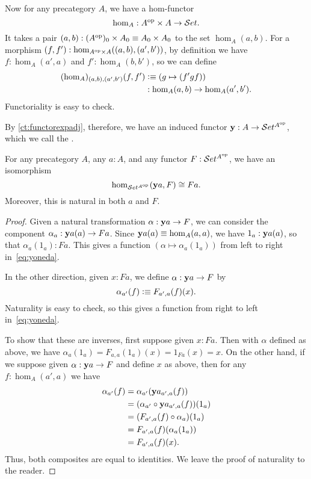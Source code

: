 Now for any precategory $A$, we have a hom-functor
\[\hom_A : A^{\textrm{op}} \times A \to \mathcal{S}et.\]
It takes a pair $(a,b): (A^{\textrm{op}})_0 \times A_0 \equiv A_0 \times A_0$ to the set $\hom_A(a,b)$.
For a morphism $(f,f') : \hom_{A^{\textrm{op}}\times A}((a,b),(a',b'))$, by definition we have $f:\hom_A(a',a)$ and $f':\hom_A(b,b')$, so we can define 
\begin{align*}
  (\hom_A)_{(a,b),(a',b')}(f,f')
  &\vcentcolon\equiv (g \mapsto (f'gf))\\
  &: \hom_A(a,b) \to \hom_A(a',b').
\end{align*}
Functoriality is easy to check.

By \autoref{ct:functorexpadj}, therefore, we have an induced functor $\mathbf{y}:A\to \mathcal{S}et^{A^{\textrm{op}}}$, which we call the .

\begin{thm}\label{ct:yoneda}
  For any precategory $A$, any $a:A$, and any functor $F:\mathcal{S}et^{A^{\textrm{op}}}$, we have an isomorphism
  \begin{equation}\label{eq:yoneda}
    \hom_{\uset^{A\op}}(\y a, F) \cong Fa.
  \end{equation}
  Moreover, this is natural in both $a$ and $F$.
\end{thm}
\begin{proof}
  Given a natural transformation $\alpha:\mathbf{y} a \to F$, we can consider the component $\alpha_a : \mathbf{y} a(a) \to F a$.
  Since $\mathbf{y} a(a)\equiv \hom_A(a,a)$, we have $1_a : \mathbf{y} a(a)$, so that $\alpha_a(1_a) : F a$.
  This gives a function $(\alpha \mapsto \alpha_a(1_a))$ from left to right in~\eqref{eq:yoneda}.

  In the other direction, given $x:F a$, we define $\alpha:\mathbf{y} a \to F$ by
  \[\alpha_{a'}(f) \vcentcolon\equiv F_{a',a}(f)(x). \]
  Naturality is easy to check, so this gives a function from right to left in~\eqref{eq:yoneda}.

  To show that these are inverses, first suppose given $x:F a$.
  Then with $\alpha$ defined as above, we have $\alpha_a(1_a) = F_{a,a}(1_a)(x) = 1_{F a}(x) = x$.
  On the other hand, if we suppose given $\alpha:\mathbf{y} a \to F$ and define $x$ as above, then for any $f:\hom_A(a',a)$ we have
  \begin{align*}
    \alpha_{a'}(f)
    &= \alpha_{a'} (\mathbf{y} a_{a',a}(f))\\
    &= (\alpha_{a'}\circ \mathbf{y} a_{a',a}(f))(1_a)\\
    &= (F_{a',a}(f)\circ \alpha_a)(1_a)\\
    &= F_{a',a}(f)(\alpha_a(1_a))\\
    &= F_{a',a}(f)(x).
  \end{align*}
  Thus, both composites are equal to identities.
  We leave the proof of naturality to the reader.
\end{proof}

